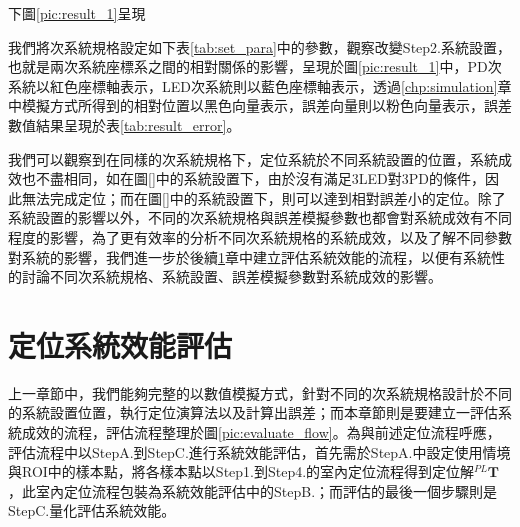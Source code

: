下圖\ref{pic:result_1}呈現

我們將次系統規格設定如下表\ref{tab:set_para}中的參數，觀察改變Step2.系統設置，也就是兩次系統座標系之間的相對關係的影響，呈現於圖\ref{pic:result_1}中，PD次系統以紅色座標軸表示，LED次系統則以藍色座標軸表示，透過\ref{chp:simulation}章中模擬方式所得到的相對位置以黑色向量表示，誤差向量則以粉色向量表示，誤差數值結果呈現於表\ref{tab:result_error}。




我們可以觀察到在同樣的次系統規格下，定位系統於不同系統設置的位置，系統成效也不盡相同，如在圖\ref{}中的系統設置下，由於沒有滿足3LED對3PD的條件，因此無法完成定位；而在圖\ref{}中的系統設置下，則可以達到相對誤差小的定位。除了系統設置的影響以外，不同的次系統規格與誤差模擬參數也都會對系統成效有不同程度的影響，為了更有效率的分析不同次系統規格的系統成效，以及了解不同參數對系統的影響，我們進一步於後續\ref{chp:system_evaluate}章中建立評估系統效能的流程，以便有系統性的討論不同次系統規格、系統設置、誤差模擬參數對系統成效的影響。







\newpage

\section{定位系統效能評估}
\label{chp:system_evaluate}

上一章節中，我們能夠完整的以數值模擬方式，針對不同的次系統規格設計於不同的系統設置位置，執行定位演算法以及計算出誤差；而本章節則是要建立一評估系統成效的流程，評估流程整理於圖\ref{pic:evaluate_flow}。為與前述定位流程呼應，評估流程中以StepA.到StepC.進行系統效能評估，首先需於StepA.中設定使用情境與ROI中的樣本點，將各樣本點以Step1.到Step4.的室內定位流程得到定位解$^{PL}\boldsymbol{T}$，此室內定位流程包裝為系統效能評估中的StepB.；而評估的最後一個步驟則是StepC.量化評估系統效能。


